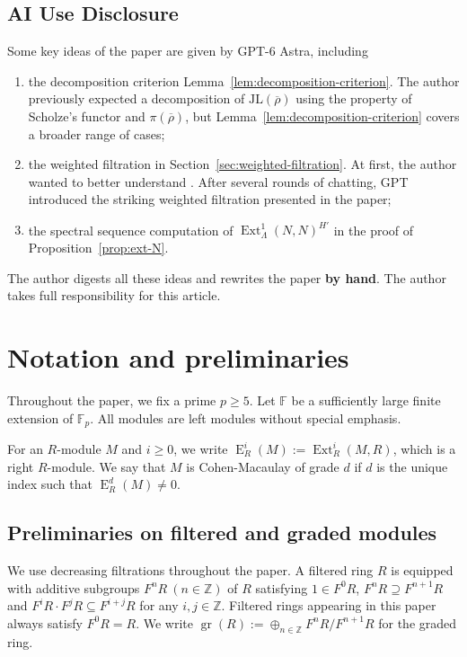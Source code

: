 \documentclass[11pt,a4paper]{article} %
\def\FF{\mathbb{F}}
\def\ZZ{\mathbb{Z}}
\def\E{\operatorname{E}}
\def\Ext{\operatorname{Ext}} %
\def\gr{\operatorname{gr}}
\def\rhobar{\overline{\rho}}
\begin{document}
\subsection*{AI Use Disclosure}
Some key ideas of the paper are given by GPT-6 Astra, including
\begin{enumerate}[label=\alph*)]
    \item the decomposition criterion Lemma~\ref{lem:decomposition-criterion}. The author previously expected a decomposition of $\mathrm{JL}(\rhobar)$ using the property of Scholze's functor and $\pi(\rhobar)$, but Lemma~\ref{lem:decomposition-criterion} covers a broader range of cases;
    \item the weighted filtration in Section~\ref{sec:weighted-filtration}. At first, the author wanted to better understand \cite[Proposition 2.21]{HW24a}. After several rounds of chatting, GPT introduced the striking weighted filtration presented in the paper;
    \item the spectral sequence computation of $\Ext^1_\Lambda(N,N)^{H'}$ in the proof of Proposition~\ref{prop:ext-N}.
\end{enumerate}
The author digests all these ideas and rewrites the paper \textbf{by hand}. The author takes full responsibility for this article.

\section{Notation and preliminaries}

Throughout the paper, we fix a prime $p\ge5$. Let $\FF$ be a sufficiently large finite extension of $\FF_p$. All modules are left modules without special emphasis.

For an $R$-module $M$ and $i\ge0$, we write $\E_R^i(M):=\Ext_R^i(M,R)$, which is a right $R$-module. We say that $M$ is Cohen-Macaulay of grade $d$ if $d$ is the unique index such that $\E_R^d(M)\ne0$.

\subsection{Preliminaries on filtered and graded modules}

We use decreasing filtrations throughout the paper. A filtered ring $R$ is equipped with additive subgroups $F^nR~(n\in\ZZ)$ of $R$ satisfying $1\in F^0R$, $F^nR\supseteq F^{n+1}R$ and $F^iR\cdot F^jR\subseteq F^{i+j}R$ for any $i,j\in\mathbb{Z}$. Filtered rings appearing in this paper always satisfy $F^0 R=R$. We write $\gr(R):=\oplus_{n\in\ZZ}F^nR/F^{n+1}R$ for the graded ring.
\end{document}
